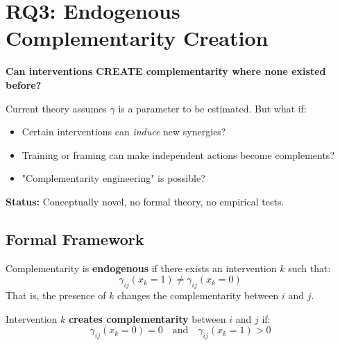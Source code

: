 \section{RQ3: Endogenous Complementarity Creation}
\label{sec:rq3-endogenous}

\begin{tcolorbox}[colback=red!5!white,colframe=red!75!black,title=\textbf{Research Question 3}]
\textbf{Can interventions CREATE complementarity where none existed before?}

Current theory assumes $\gamma$ is a parameter to be estimated. But what if:
\begin{itemize}[noitemsep]
    \item Certain interventions can \textit{induce} new synergies?
    \item Training or framing can make independent actions become complements?
    \item "Complementarity engineering" is possible?
\end{itemize}

\textbf{Status:} Conceptually novel, no formal theory, no empirical tests.
\end{tcolorbox}

\subsection{Formal Framework}

\begin{definition}
Complementarity is \textbf{endogenous} if there exists an intervention $k$ such that:
\begin{equation}
\gamma_{ij}(x_k = 1) \neq \gamma_{ij}(x_k = 0)
\label{eq:endogenous-gamma}
\end{equation}
That is, the presence of $k$ changes the complementarity between $i$ and $j$.
\end{definition}

\begin{definition}
Intervention $k$ \textbf{creates complementarity} between $i$ and $j$ if:
\begin{equation}
\gamma_{ij}(x_k = 0) = 0 \quad \text{and} \quad \gamma_{ij}(x_k = 1) > 0
\end{equation}
\end{definition}

